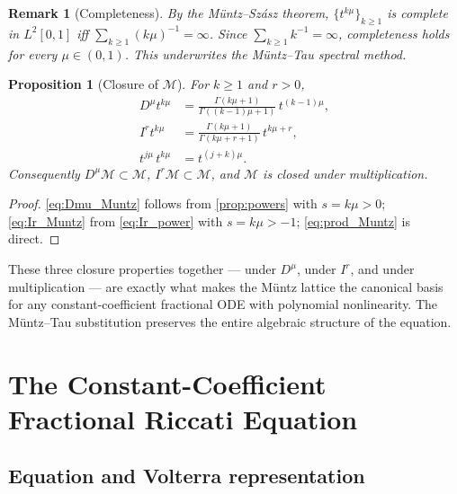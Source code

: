 \documentclass[11pt,a4paper]{article}
\newtheorem{proposition}[theorem]{Proposition}
\newtheorem{remark}[theorem]{Remark}
\begin{document}
\begin{remark}[Completeness]\label{rem:muntz_complete}
By the M\"untz--Sz\'asz theorem, \(\{t^{k\mu}\}_{k\ge1}\) is complete in \(L^2[0,1]\) iff \(\sum_{k\ge1}(k\mu)^{-1}=\infty\).
Since \(\sum_{k\ge1}k^{-1}=\infty\), completeness holds for every \(\mu\in(0,1)\).
This underwrites the M\"untz--Tau spectral method.
\end{remark}

\begin{proposition}[Closure of \(\mathcal{M}\)]\label{prop:closure_M}
For \(k\ge1\) and \(r>0\),
\begin{align}
D^\mu t^{k\mu} &= \frac{\Gamma(k\mu+1)}{\Gamma((k-1)\mu+1)}\,t^{(k-1)\mu},\label{eq:Dmu_Muntz}\\
I^r t^{k\mu} &= \frac{\Gamma(k\mu+1)}{\Gamma(k\mu+r+1)}\,t^{k\mu+r},\label{eq:Ir_Muntz}\\
t^{j\mu}\,t^{k\mu} &= t^{(j+k)\mu}.\label{eq:prod_Muntz}
\end{align}
Consequently \(D^\mu\mathcal{M}\subset\mathcal{M}\), \(I^r\mathcal{M}\subset\mathcal{M}\), and \(\mathcal{M}\) is closed under multiplication.
\end{proposition}

\begin{proof}
\eqref{eq:Dmu_Muntz} follows from \cref{prop:powers} with \(s=k\mu>0\); \eqref{eq:Ir_Muntz} from \eqref{eq:Ir_power} with \(s=k\mu>-1\); \eqref{eq:prod_Muntz} is direct.
\end{proof}

These three closure properties together --- under \(D^\mu\), under \(I^r\), and under multiplication --- are exactly what makes the M\"untz lattice the canonical basis for any constant-coefficient fractional ODE with polynomial nonlinearity.
The M\"untz--Tau substitution \cite{esmaeili2015} preserves the entire algebraic structure of the equation.

\section{The Constant-Coefficient Fractional Riccati Equation}\label{sec:riccati}

\subsection{Equation and Volterra representation}
\end{document}
